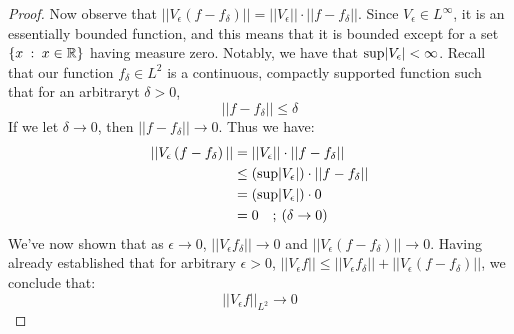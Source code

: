 \documentclass{article}
\theoremstyle{plain}
\begin{document}
\begin{proof}
\noindent Now observe that $ || V_{\epsilon} \left( f - f_{\delta}\right) || = || V_{\epsilon} || \cdot || f - f_{\delta} || $. Since $ V_{\epsilon} \in L^{\infty} $, it is an essentially bounded function, and this means that it is bounded except for a set $ \left\{ x \hspace{.25 em} : \hspace{.25 em} x \in \mathbb{R} \right\} $ having measure zero. Notably, we have that $ \text{\rm{sup}} |V_{\epsilon}| < \infty $. Recall that our function $ f_{\delta} \in L^{2} $ is a continuous, compactly supported function such that for an arbitraryt $ \delta > 0 $,
$$  || f - f_{\delta} || \leq \delta $$
If we let $ \delta \to 0 $, then $ || f - f_{\delta} || \to 0 $. Thus we have:
\begin{align*}
|| V_{\epsilon} \left(f-f_{\delta}\right) || & = || V_{\epsilon} || \cdot || f - f_{\delta} || \\
& \leq \left(\text{\rm{sup}}|V_{\epsilon}|\right) \cdot ||f-f_{\delta}|| \\
& = \left(\text{\rm{sup}}|V_{\epsilon}|\right) \cdot 0 \\
& = 0 \quad;\hspace{.2 em} \left(\delta \to 0\right)
\end{align*}
We've now shown that as $ \epsilon \to 0 $, $ || V_{\epsilon} f_{\delta} || \to 0 $ and $ || V_{\epsilon} \left(f - f_{\delta} \right) || \to 0 $. Having already established that for arbitrary $ \epsilon > 0$,  $ || V_{\epsilon} f || \leq ||V_{\epsilon} f_{\delta} || + || V_{\epsilon} \left(f-f_{\delta}\right)|| $, we conclude that:
$$ || V_{\epsilon} f ||_{L^{2}} \to 0 $$
\end{proof}
\end{document}
